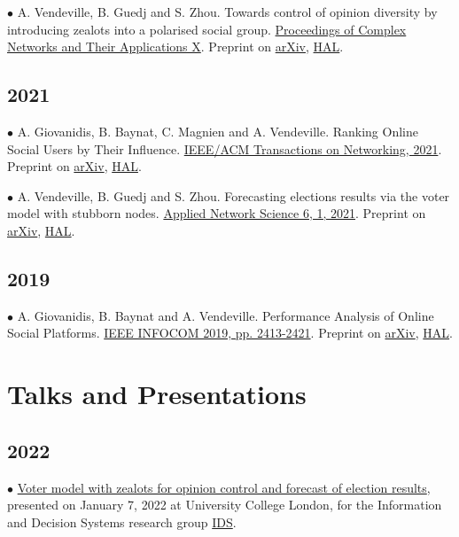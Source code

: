 \documentclass[a4paper,10pt]{article}
\begin{document}
$\bullet$ A. Vendeville, B. Guedj and S. Zhou. Towards control of opinion diversity by introducing zealots into a polarised social group. \href{https://link.springer.com/chapter/10.1007\%2F978-3-030-93413-2_29}{Proceedings of Complex Networks and Their Applications X}. Preprint on \href{https://arxiv.org/abs/2006.07265}{arXiv}, \href{https://hal.inria.fr/hal-02872161}{HAL}.

\subsection*{2021}
$\bullet$ A. Giovanidis, B. Baynat, C. Magnien and A. Vendeville. Ranking Online Social Users by Their Influence. \href{https://doi.org/10.1109/TNET.2021.3085201}{IEEE/ACM Transactions on Networking, 2021}. Preprint on \href{https://arxiv.org/abs/2107.01914}{arXiv}, \href{https://hal.archives-ouvertes.fr/hal-02970215}{HAL}.

$\bullet$ A. Vendeville, B. Guedj and S. Zhou. Forecasting elections results via the voter model with stubborn nodes. \href{https://doi.org/10.1007/s41109-020-00342-7}{Applied Network Science 6, 1, 2021}. Preprint on \href{https://arxiv.org/abs/2009.10627}{arXiv}, \href{https://hal.archives-ouvertes.fr/hal-02946434}{HAL}.

\subsection*{2019}
$\bullet$ A. Giovanidis, B. Baynat and A. Vendeville. Performance Analysis of Online Social Platforms. \href{https://ieeexplore.ieee.org/abstract/document/8737539}{IEEE INFOCOM 2019, pp. 2413-2421}. Preprint on \href{https://arxiv.org/abs/1902.07187}{arXiv}, \href{https://hal.archives-ouvertes.fr/hal-01941296}{HAL}.


\section*{Talks and Presentations}
\subsection*{2022}
$\bullet$ \href{https://antoinevendeville.github.io/files/talk_IDS.pdf}{Voter model with zealots for opinion control and forecast of election results}, presented on January 7, 2022 at University College London, for the Information and Decision Systems research group \href{https://www.ucl.ac.uk/computer-science/research/research-groups/information-and-decision-systems-ids}{IDS}.
\end{document}
